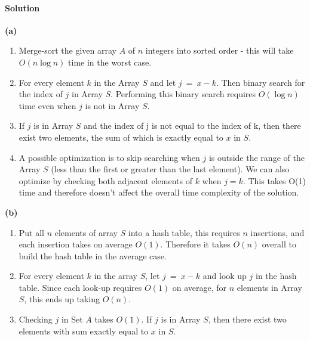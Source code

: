 \documentclass[a4paper]{scrartcl}
\begin{document}
\paragraph{Solution}
{\bfseries(a)}
\begin{enumerate}
  \item Merge-sort the given array $A$ of $n$ integers into sorted order - this will take  $O(n\log{n})$ time in the worst case.
  \item For every element $k$ in the Array $S$ and let $j\ =\ x-k$. Then binary search for the index of $j$ in Array $S$. Performing this binary search requires $O(\log{n})$ time even when $j$ is not in Array $S$. 
  \item If $j$ is in Array $S$ and the index of j is not equal to the index of k, then there exist two elements, the sum of which is exactly equal to $x$ in $S$.
  \item A possible optimization is to skip searching when $j$ is outside the range of the Array $S$ (less than the first or greater than the last element). We can also optimize by checking both adjacent elements of $k$ when $j = k$. This takes O(1) time and therefore doesn't affect the overall time complexity of the solution.
\end{enumerate}

{\bfseries(b)}
\begin{enumerate}
 \item Put all $n$ elements of array $S$ into a hash table, this requires $n$ insertions, and each insertion takes on average $O(1)$. Therefore it takes $O(n)$ overall to build the hash table in the average case.
 \item For every element $k$ in the array $S$, let $j\ =\ x-k$ and look up $j$ in the hash table. Since each look-up requires $O(1)$ on average, for $n$ elements in Array $S$, this ends up taking $O(n)$.
 \item Checking $j$ in Set $A$ takes $O(1)$. If $j$ is in Array $S$, then there exist two elements with sum exactly equal to $x$ in $S$.
\end{enumerate}
\end{document}
